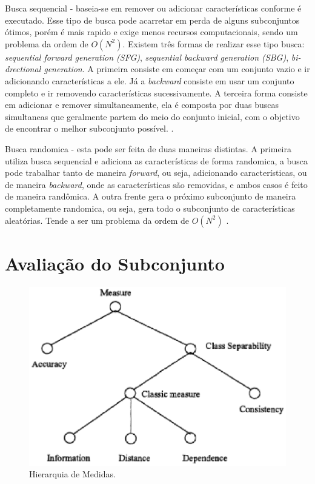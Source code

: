 Busca sequencial - baseia-se em remover ou adicionar características conforme é executado. Esse tipo de busca pode acarretar em perda de alguns subconjuntos ótimos, porém é mais rapido e exige menos recursos computacionais, sendo um problema da ordem de $O(N^2)$. \cite{dash_1997} Existem três formas de realizar esse tipo busca: \textit{sequential forward generation (SFG)}, \textit{ sequential backward generation (SBG)}, \textit{bi-drectional generation}. A primeira consiste em começar com um conjunto vazio e ir adicionando características a ele. Já a \textit{backward} consiste em usar um conjunto completo e ir removendo características sucessivamente. A terceira forma consiste em adicionar e remover simultaneamente, ela é composta por duas buscas simultaneas que geralmente partem do meio do conjunto inicial, com o objetivo de encontrar o melhor subconjunto possível. \cite{liu_2005}. 

Busca randomica - esta pode ser feita de duas maneiras distintas. A primeira utiliza busca sequencial e adiciona as características de forma randomica, a busca pode trabalhar tanto de maneira \textit{forward}, ou seja, adicionando características, ou de maneira \textit{backward}, onde as características são removidas, e ambos casos é feito de maneira randômica. A outra frente gera o próximo subconjunto de maneira completamente randomica, ou seja, gera todo o subconjunto de características aleatórias. Tende a ser um problema da ordem de $O(N^2)$ \cite{liu_2005}.

\section{Avaliação do Subconjunto}

\begin{figure}[h]
	\centering
	\label{fig04}
		\includegraphics[keepaspectratio=true,scale=1]{figuras/fig04.eps}
	\caption{Hierarquia de Medidas. \cite{huan_1998}}
\end{figure}

